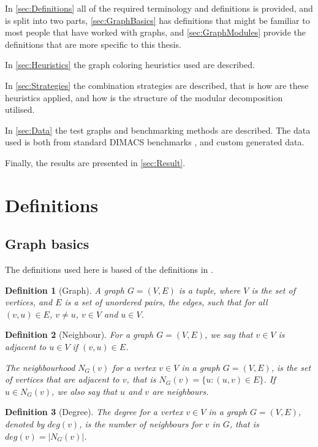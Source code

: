 \documentclass{amsart}
\newtheorem{definition}{Definition}[section]
\begin{document}
In \autoref{sec:Definitions} all of the required terminology and definitions is
provided, and is split into two parts, \autoref{sec:GraphBasics} has definitions that might be
familiar to most people that have worked with graphs, and
\autoref{sec:GraphModules} provide the definitions that are more specific to
this thesis.

In \autoref{sec:Heuristics} the graph coloring heuristics used are described.

In \autoref{sec:Strategies} the combination strategies are described, that is how are
these heuristics applied, and how is the structure of the modular decomposition
utilised.

In \autoref{sec:Data} the test graphs and benchmarking methods are described. The data
used is both from standard DIMACS benchmarks \cite{DIMACS}, and custom generated data.

Finally, the results are presented in \autoref{sec:Result}.

\section{Definitions}
\label{sec:Definitions}

\subsection{Graph basics}
\label{sec:GraphBasics}

The definitions used here is based of the definitions in 
\cite{GraphBasics}.

\begin{definition}[Graph]
    A graph $G = (V,E)$ is a tuple, where $V$ is the set of vertices, and $E$ is
    a set of unordered pairs, the edges, such that for all $(v,u) \in E$,
    $v \neq u$, $v \in V$ and $u \in V$.
\end{definition}
\begin{definition}[Neighbour]
    For a graph $G = (V,E)$, we say that $v \in V$ is adjacent to 
    $u \in V$ if $(v,u) \in E$. 

    The neighbourhood $N_G(v)$ for a vertex $v \in V$ in a graph $G = (V,E)$,
    is the set of vertices that are adjacent to $v$, that is 
    $N_G(v) = \{u : (u,v) \in E \}$. If $u \in N_G(v)$, we also say
    that $u$ and $v$ are neighbours.
\end{definition}
\begin{definition}[Degree]
    The degree for a vertex $v \in V$ in a graph $G = (V,E)$, denoted by 
    $deg(v)$, is the number of neighbours for $v$ in $G$, that is 
    $deg(v) = |N_G(v)|$.
\end{definition}
\end{document}
